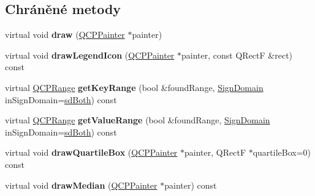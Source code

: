 \subsection*{Chráněné metody}
\begin{DoxyCompactItemize}
\item 
\hypertarget{classQCPStatisticalBox_a753b62761217dd6b92f8a29e286a1317}{}virtual void {\bfseries draw} (\hyperlink{classQCPPainter}{Q\+C\+P\+Painter} $\ast$painter)\label{classQCPStatisticalBox_a753b62761217dd6b92f8a29e286a1317}

\item 
\hypertarget{classQCPStatisticalBox_a51764ed423fa02d3ef63f6848851ec33}{}virtual void {\bfseries draw\+Legend\+Icon} (\hyperlink{classQCPPainter}{Q\+C\+P\+Painter} $\ast$painter, const Q\+Rect\+F \&rect) const \label{classQCPStatisticalBox_a51764ed423fa02d3ef63f6848851ec33}

\item 
\hypertarget{classQCPStatisticalBox_ad700fdce0f456dd22a3679d61e9896a4}{}virtual \hyperlink{classQCPRange}{Q\+C\+P\+Range} {\bfseries get\+Key\+Range} (bool \&found\+Range, \hyperlink{classQCPAbstractPlottable_a661743478a1d3c09d28ec2711d7653d8}{Sign\+Domain} in\+Sign\+Domain=\hyperlink{classQCPAbstractPlottable_a661743478a1d3c09d28ec2711d7653d8a082b98cfb91a7363a3b5cd17b0c1cd60}{sd\+Both}) const \label{classQCPStatisticalBox_ad700fdce0f456dd22a3679d61e9896a4}

\item 
\hypertarget{classQCPStatisticalBox_adeef8c9a0361683c776bca2fbff292b7}{}virtual \hyperlink{classQCPRange}{Q\+C\+P\+Range} {\bfseries get\+Value\+Range} (bool \&found\+Range, \hyperlink{classQCPAbstractPlottable_a661743478a1d3c09d28ec2711d7653d8}{Sign\+Domain} in\+Sign\+Domain=\hyperlink{classQCPAbstractPlottable_a661743478a1d3c09d28ec2711d7653d8a082b98cfb91a7363a3b5cd17b0c1cd60}{sd\+Both}) const \label{classQCPStatisticalBox_adeef8c9a0361683c776bca2fbff292b7}

\item 
\hypertarget{classQCPStatisticalBox_a9ad0abdb154fefb04e9872f0db8e2ec7}{}virtual void {\bfseries draw\+Quartile\+Box} (\hyperlink{classQCPPainter}{Q\+C\+P\+Painter} $\ast$painter, Q\+Rect\+F $\ast$quartile\+Box=0) const \label{classQCPStatisticalBox_a9ad0abdb154fefb04e9872f0db8e2ec7}

\item 
\hypertarget{classQCPStatisticalBox_a16fef8bc19e5a09d82033edcfe919495}{}virtual void {\bfseries draw\+Median} (\hyperlink{classQCPPainter}{Q\+C\+P\+Painter} $\ast$painter) const \label{classQCPStatisticalBox_a16fef8bc19e5a09d82033edcfe919495}


\end{DoxyCompactItemize}
